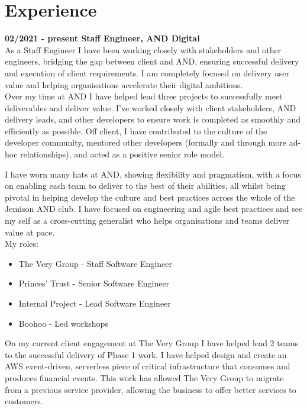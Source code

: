 \section{Experience}

\textbf{02/2021 - present \hspace{2.75em}Staff Engineer, AND Digital}\\

As a Staff Engineer I have been working closely with stakeholders and other engineers, bridging the gap between client and AND, ensuring successful delivery and execution of client requirements. I am completely focused on delivery user value and helping organisations accelerate their digital ambitions.\\

Over my time at AND I have helped lead three projects to successfully meet deliverables and deliver value. I’ve worked closely with client stakeholders, AND delivery leads, and other developers to ensure work is completed as smoothly and efficiently as possible. Off client, I have contributed to the culture of the developer community, mentored other developers (formally and through more ad-hoc relationships), and acted as a positive senior role model.

I have worn many hats at AND, showing flexibility and pragmatism, with a focus on enabling each team to deliver to the best of their abilities, all whilst being pivotal in helping develop the culture and best practices across the whole of the Jemison AND club. I have focused on engineering and agile best practices and see my self as a cross-cutting generalist who helps organisations and teams deliver value at pace.\\

My roles:\\

\begin{itemize}
  \item The Very Group   - Staff Software Engineer
  \item Princes' Trust   - Senior Software Engineer
  \item Internal Project - Lead Software Engineer
  \item Boohoo           - Led workshops
\end{itemize}

\bigskip

On my current client engagement at The Very Group I have helped lead 2 teams to the successful delivery of Phase 1 work. I have helped design and create an AWS event-driven, serverless piece of critical infrastructure that consumes and produces financial events. This work has allowed The Very Group to migrate from a previous service provider, allowing the business to offer better services to customers.

